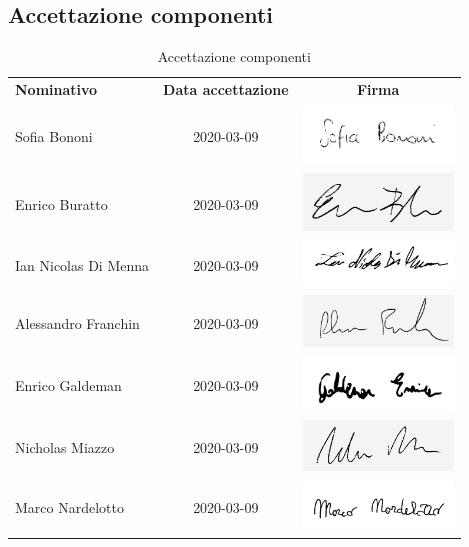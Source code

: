 \documentclass[../piano-di-progetto.tex]{subfiles}
\begin{document}
  \subsection{Accettazione componenti}

  \begin{table}[H]
    \centering
    \begin{tabular}{lcc}
      \rowcolor{lightgray}
      \textbf{Nominativo}  & \textbf{Data accettazione} & \textbf{Firma}  \\
      Sofia Bononi & 2020-03-09 & \includegraphics[width=4cm]{img/sofia.png} \\
      Enrico Buratto & 2020-03-09 & \includegraphics[width=4cm]{img/enricob-g.png}     \\
      Ian Nicolas Di Menna & 2020-03-09 & \includegraphics[width=4cm]{img/ian.png}     \\
      Alessandro Franchin & 2020-03-09 & \includegraphics[width=4cm]{img/ale-g.png}     \\
      Enrico Galdeman & 2020-03-09 & \includegraphics[width=4cm]{img/enricog.png}     \\
      Nicholas Miazzo & 2020-03-09 & \includegraphics[width=4cm]{img/nicholas-g.png}     \\
      Marco Nardelotto & 2020-03-09 & \includegraphics[width=4cm]{img/marco.png}
    \end{tabular}
    \caption{Accettazione componenti}
  \end{table}
\end{document}
